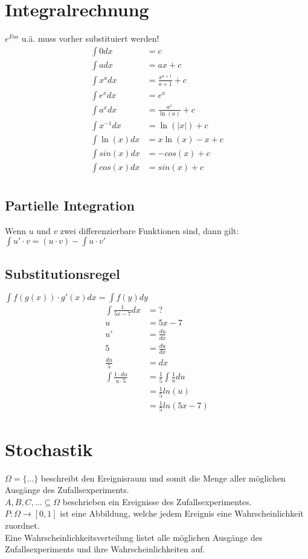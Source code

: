 \documentclass[a4paper, 8pt, landscape]{extarticle}
\let\oldint\int
\renewcommand{\int}{\ensuremath{\textstyle\oldint}}
\begin{document}
\begin{multicols*}{5}
	\section{Integralrechnung}
	    $e^{Foo}$ u.ä. muss vorher substituiert werden!\\
        \begin{align*}
        	\int 0 dx &= c\\
	        \int a dx &= ax+c\\
	        \int x^a dx &= \frac{x^{a+1}}{a+1}+c\\
	        \int e^x dx &= e^x\\
	        \int a^x dx &= \frac{a^x}{\ln(a)}+c\\
	        \int x^{-1} dx &= \ln(|x|)+c\\
	        \int \ln (x) dx &= x\ln(x)-x +c\\
	        \int sin(x) dx &= -cos(x)+c\\
	        \int cos(x) dx &= sin(x)+c\\
        \end{align*}
        \subsection{Partielle Integration}
	        Wenn $u$ und $v$ zwei differenzierbare Funktionen sind, dann gilt: \\
	        $\int u' \cdot v = (u \cdot v) - \int u \cdot v'$
        \subsection{Substitutionsregel}
	        $\int f(g(x)) \cdot g'(x) dx = \int f(y) dy$
	        \begin{align*}
	            \int \frac{1}{5x - 7} dx &= ?\\
	            u &= 5x-7\\
	            u' &= \frac{du}{dx} \\
	            5 &= \frac{du}{dx} \\   
	            \frac{du}{5} &= dx  \\
	            \int \frac{1 \cdot du}{u \cdot 5} &= \frac{1}{5} \int \frac{1}{u} du \\
                &= \frac{1}{5} ln(u) \\
                &= \frac{1}{5} ln(5x-7)
	        \end{align*}
	\section{Stochastik}
	    $\Omega = \{ ... \}$ beschreibt den Ereignisraum und somit die Menge aller möglichen Ausgänge des Zufallsexperiments.\\
    	$A, B, C, ... \subseteq \Omega$ beschrieben ein Ereignisse des Zufallsexperimentes.\\
    	$P: \Omega \rightarrow [0,1]$ ist eine Abbildung, welche jedem Ereignis eine Wahrscheinlichkeit zuordnet.\\
    	Eine Wahrscheinlichkeitsverteilung listet alle möglichen Ausgänge des Zufallsexperiments und ihre Wahrscheinlichkeiten auf.

\end{multicols*}
\end{document}
